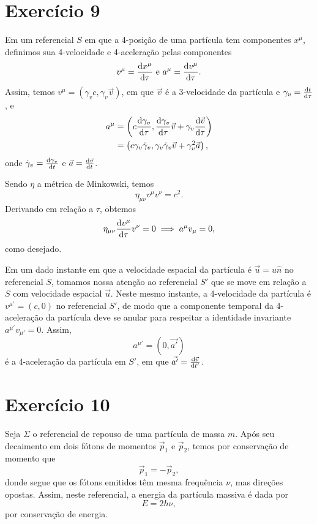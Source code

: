 \documentclass[12pt,a4paper]{article}
\numberwithin{equation}{section}
\begin{document}
\section*{Exercício 9}
Em um referencial \(S\) em que a 4-posição de uma partícula tem componentes \(x^\mu\), definimos sua 4-velocidade e 4-aceleração pelas componentes
\begin{equation*}
    v^\mu = \diff{x^\mu}{\tau} \text{ e } a^\mu = \diff{v^\mu}{\tau}.
\end{equation*}
Assim, temos \(v^\mu = (\gamma_v c, \gamma_v \vec{v})\), em que \(\vec{v}\) é a 3-velocidade da partícula e \(\gamma_v = \diff{t}{\tau}\), e
\begin{align*}
    a^\mu &= \left(c\diff{\gamma_v}{\tau}, \diff{\gamma_v}{\tau} \vec{v} + \gamma_v \diff{\vec{v}}{\tau}\right)\\
          &= \left(c \gamma_v \dot \gamma_v, \gamma_v \dot \gamma_v \vec{v} + \gamma_v^2 \vec{a} \right),
\end{align*}
onde \(\dot \gamma_v = \diff{\gamma_v}{t}\) e \(\vec{a} = \diff{\vec{v}}{t}\).

Sendo \(\eta\) a métrica de Minkowski, temos
\begin{equation*}
    \eta_{\mu \nu} v^\mu v^\nu = c^2.
\end{equation*}
Derivando em relação a \(\tau\), obtemos
\begin{equation*}
    \eta_{\mu\nu}\diff{v^\mu}{\tau}v^\nu = 0 \implies a^\mu v_\mu  = 0,
\end{equation*}
como desejado.

Em um dado instante em que a velocidade espacial da partícula é \(\vec{u} = u \hat{n}\) no referencial \(S\), tomamos nossa atenção ao referencial \(S'\) que se move em relação a \(S\) com velocidade espacial \(\vec{u}\). Neste mesmo instante, a 4-velocidade da partícula é \(v^{\mu'} = (c, 0)\) no referencial \(S'\), de modo que a componente temporal da 4-aceleração da partícula deve se anular para respeitar a identidade invariante \(a^{\mu'}v_{\mu'} = 0\). Assim,
\begin{equation*}
    a^{\mu'} = (0, \vec{a'})
\end{equation*}
é a 4-aceleração da partícula em \(S'\), em que \(\vec{a'} = \diff{\vec{v}}{t'}\).

\section*{Exercício 10}
Seja \(\Sigma\) o referencial de repouso de uma partícula de massa \(m\). Após seu decaimento em dois fótons de momentos \(\vec{p}_1 \) e \(\vec{p}_2\), temos por conservação de momento que
\begin{equation*}
    \vec{p}_1 = -\vec{p}_2,
\end{equation*}
donde segue que os fótons emitidos têm mesma frequência \(\nu\), mas direções opostas. Assim, neste referencial, a energia da partícula massiva é dada por
\begin{equation*}
    E = 2h\nu,
\end{equation*}
por conservação de energia.
\end{document}
